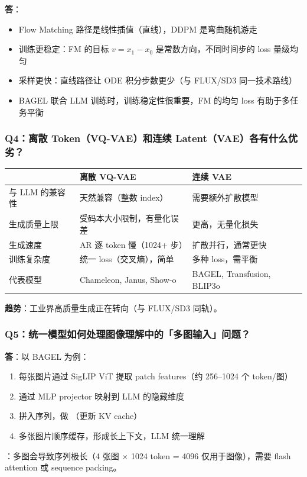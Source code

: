 \begin{summarybox}
\textbf{答}：
\begin{itemize}
  \item Flow Matching 路径是线性插值（直线），DDPM 是弯曲随机游走
  \item 训练更稳定：FM 的目标 $v = x_1 - x_0$ 是常数方向，不同时间步的 loss 量级均匀
  \item 采样更快：直线路径让 ODE 积分步数更少（与 FLUX/SD3 同一技术路线）
  \item BAGEL 联合 LLM 训练时，训练稳定性很重要，FM 的均匀 loss 有助于多任务平衡
\end{itemize}
\end{summarybox}

\subsubsection{Q4：离散 Token（VQ-VAE）和连续 Latent（VAE）各有什么优劣？}

\begin{center}
{\small
\begin{tabular}{|l|p{5cm}|p{5cm}|}
\hline
 & \textbf{离散 VQ-VAE} & \textbf{连续 VAE} \\
\hline
与 LLM 的兼容性 & 天然兼容（整数 index） & 需要额外扩散模型 \\
生成质量上限 & 受码本大小限制，有量化误差 & 更高，无量化损失 \\
生成速度 & AR 逐 token 慢（1024+ 步） & 扩散并行，通常更快 \\
训练复杂度 & 统一 loss（交叉熵），简单 & 多种 loss，需平衡 \\
代表模型 & Chameleon, Janus, Show-o & BAGEL, Transfusion, BLIP3o \\
\hline
\end{tabular}
}
\end{center}

\begin{summarybox}
\textbf{趋势}：工业界高质量生成正在转向（与 FLUX/SD3 同轨）。
\end{summarybox}

\subsubsection{Q5：统一模型如何处理图像理解中的「多图输入」问题？}

\begin{summarybox}
\textbf{答}：以 BAGEL 为例：
\begin{enumerate}
  \item 每张图片通过 SigLIP ViT 提取 patch features（约 256--1024 个 token/图）
  \item 通过 MLP projector 映射到 LLM 的隐藏维度
  \item 拼入序列，做 （更新 KV cache）
  \item 多张图片顺序缓存，形成长上下文，LLM 统一理解
\end{enumerate}
：多图会导致序列极长（4 张图 $\times$ 1024 token = 4096 仅用于图像），需要 flash attention 或 sequence packing。
\end{summarybox}

